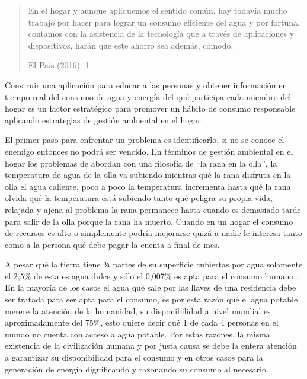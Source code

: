 \documentclass[a4paper,man,natbib]{apa6}
\begin{document}
\begin{quote}
    \vspace{5pt}
    {\small
    En el hogar y aunque apliquemos el sentido común, hay todavía mucho trabajo por hacer para lograr un consumo eficiente del agua y por fortuna, contamos con la asistencia de la tecnología que a través de aplicaciones y dispositivos, harán que este ahorro sea además, cómodo.
    }
    \begin{flushright}
        El Pais (2016): 1
    \end{flushright}

\end{quote}

Construir una aplicación para educar a las personas y obtener información en tiempo real del consumo de agua y energía del qué participa cada miembro del hogar es un factor estratégico para promover un hábito de consumo responsable aplicando estrategias de gestión ambiental en el hogar.\newline

El primer paso para enfrentar un problema es identificarlo, si no se conoce el enemigo entonces no podrá ser vencido. En términos de gestión ambiental en el hogar los problemas de abordan con una filosofía de “la rana en la olla”,  la temperatura de agua de la olla va subiendo mientras qué la rana disfruta en la olla el agua caliente, poco a poco la temperatura incrementa hasta qué la rana olvida qué la temperatura está subiendo tanto qué peligra su propia vida, relajada y ajena al problema la rana permanece hasta cuando es demasiado tarde para salir de la olla porque la rana ha muerto. Cuando en un hogar el consumo de recursos es alto o simplemente podría mejorarse quizá a nadie le interesa tanto como a la persona qué debe pagar la cuenta a final de mes.\newline

A pesar qué la tierra tiene ¾ partes de su superficie cubiertas por agua solamente el 2,5\% de esta es agua dulce y sólo el 0,007\% es apta para el consumo humano \citep{Aguaenel98:online}. En la mayoría de los casos el agua qué sale por las llaves de una residencia debe ser tratada para ser apta para el consumo, es por esta razón qué el agua potable merece la atención de la humanidad, su disponibilidad a nivel mundial es aproximadamente del 75\%, \citep{Milesdem41:online} esto quiere decir qué 1 de cada 4 personas en el mundo no cuenta con acceso a agua potable. Por estas razones, la misma existencia de la civilización humana y por justa causa se debe la entera atención a garantizar su disponibilidad para el consumo y en otros casos para la generación de energía dignificando y razonando su consumo al necesario.\newline
\end{document}
